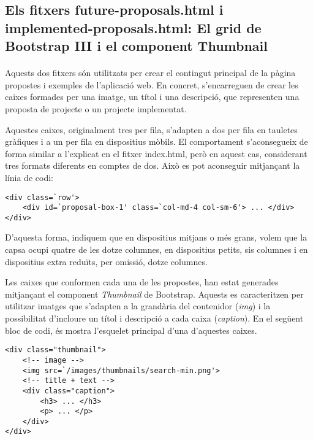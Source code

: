 \subsection{Els fitxers future-proposals.html i implemented-proposals.html: El grid de Bootstrap III i el component Thumbnail}

    \paragraph{}
    Aquests dos fitxers són utilitzats per crear el contingut principal de la pàgina propostes i exemples de l'aplicació web. En concret, s'encarreguen de crear les caixes formades per una imatge, un títol i una descripció, que representen una proposta de projecte o un projecte implementat.

    Aquestes caixes, originalment tres per fila, s'adapten a dos per fila en tauletes gràfiques i a un per fila en dispositius mòbils. El comportament s'aconsegueix de forma similar a l'explicat en el fitxer index.html, però en aquest cas, considerant tres formats diferents en comptes de dos. Això es pot aconseguir mitjançant la línia de codi:

    \begin{lstlisting}[style=rawOwn,caption={Multiples configuracions en un bloc de columnes}]
<div class=`row'>
    <div id=`proposal-box-1' class=`col-md-4 col-sm-6'> ... </div>
</div>
    \end{lstlisting}

    D'aquesta forma, indiquem que en dispositius mitjans o més grans, volem que la capsa ocupi quatre de les dotze columnes, en dispositius petits, sis columnes i en dispositius extra reduïts, per omissió, dotze columnes.

    Les caixes que conformen cada una de les propostes, han estat generades mitjançant el component \emph{Thumbnail} de Bootstrap. Aquests es caracteritzen per utilitzar imatges que s'adapten a la grandària del contenidor (\emph{img}) i la possibilitat d'incloure un títol i descripció a cada caixa (\emph{caption}). En el següent bloc de codi, és mostra l'esquelet principal d'una d'aquestes caixes.

    \begin{lstlisting}[style=rawOwn,caption={Exemple de Bootstrap Thumbnail}]
<div class="thumbnail">
    <!-- image -->
    <img src=`/images/thumbnails/search-min.png'>
    <!-- title + text -->
    <div class="caption">
        <h3> ... </h3>
        <p> ... </p>
    </div>
</div>
    \end{lstlisting}
